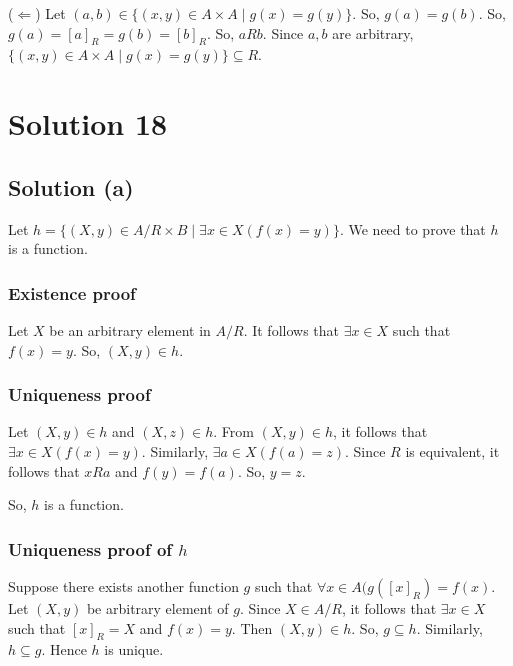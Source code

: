 \documentclass{article}
\begin{document}
($\Leftarrow$) Let $(a,b) \in \{(x,y) \in A \times A \mid g(x) =
g(y)\}$. So, $g(a) = g(b)$. So, $g(a) = [a]_R = g(b) = [b]_R$. So,
$aRb$. Since $a,b$ are arbitrary, $\{(x,y) \in A \times A \mid g(x) =
g(y)\} \subseteq R$.

\section{Solution 18}
\subsection{Solution (a)}
Let $h = \{(X,y) \in A/R \times B \mid \exists x \in X(f(x) = y)\}$.
We need to prove that $h$ is a function.
\subsubsection{Existence proof}
Let $X$ be an arbitrary element in $A/R$. It follows that $\exists x
\in X$ such that $f(x) = y$. So, $(X,y) \in h$.

\subsubsection{Uniqueness proof}
Let $(X,y) \in h$ and $(X,z) \in h$. From $(X,y) \in h$, it follows
that $\exists x \in X(f(x) = y)$. Similarly, $\exists a \in X(f(a) =
z)$. Since $R$ is equivalent, it follows that $xRa$ and $f(y) = f(a)$.
So, $y = z$.

So, $h$ is a function.

\subsubsection{Uniqueness proof of $h$}
Suppose there exists another function $g$ such that $\forall x \in
A(g([x]_R) = f(x)$. Let $(X,y)$ be arbitrary element of $g$. Since $X
\in A/R$, it follows that $\exists x \in X$ such that $[x]_R = X$ and
$f(x) = y$. Then $(X,y) \in h$. So, $g \subseteq h$. Similarly, 
$h \subseteq g$. Hence $h$ is unique.
\end{document}
